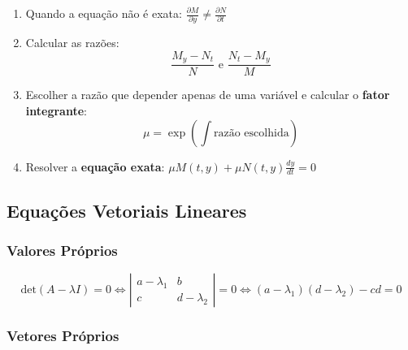 \documentclass[11pt, a4paper]{article}
\begin{document}
\begin{enumerate}
    \item Quando a equação não é exata:
          $\displaystyle \frac{\partial M}{\partial y} \neq
              \frac{\partial N}{\partial t}$
    \item Calcular as razões:
          \begin{equation*}
              \frac{M_y - N_t}{N} \text{\ \ \ \ e \ \ \ } \frac{N_t - M_y}{M}
          \end{equation*}
    \item Escolher a razão que depender apenas de uma variável e calcular o
          \textbf{fator integrante}:
          \begin{equation*}
              \mu = \exp\left(\int \text{razão escolhida}\right)
          \end{equation*}
    \item Resolver a \textbf{equação exata}:
          $\displaystyle \mu M(t,y) + \mu N(t, y)\frac{dy}{dt} = 0$

\end{enumerate}

\subsection{Equações Vetoriais Lineares}

\subsubsection*{Valores Próprios}

\begin{equation*}
    \text{det}(A - \lambda I) = 0 \Leftrightarrow 
    \left\lvert \begin{matrix} 
        a - \lambda_1 & b \\ c & d - \lambda_2
    \end{matrix}\right\rvert = 0 \Leftrightarrow
    (a - \lambda_1)(d - \lambda_2) - cd = 0
\end{equation*}

\subsubsection*{Vetores Próprios}
\end{document}
